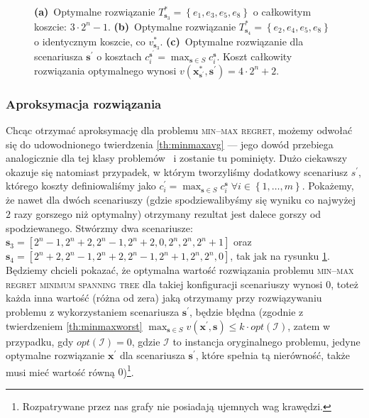 \begin{figure}[!htbp]
{		\textbf{(a)}~Optymalne rozwiązanie $T^{\ast}_{\textbf{s}_{3}} = \left\{ e_{1}, e_{3}, e_{5}, e_{8} \right\}$ o całkowitym koszcie: $3 \cdot 2^{n} - 1$.
		\textbf{(b)}~Optymalne rozwiązanie $T^{\ast}_{\textbf{s}_{4}} = \left\{ e_{2}, e_{4}, e_{5}, e_{8} \right\}$ o identycznym koszcie, co $v^{\ast}_{\textbf{s}_{3}}$.
		\textbf{(c)}~Optymalne rozwiązanie dla scenariusza $\textbf{s}^{\prime}$ o kosztach $c_{i}^{\textbf{s}^{\prime}} = \max_{\textbf{s} \in S} c_{i}^{\textbf{s}}$. Koszt całkowity rozwiązania optymalnego wynosi $v \left( \textbf{x}^{\ast}_{\textbf{s}^{\prime}}, \textbf{s}^{\prime} \right) = 4 \cdot 2^{n} + 2$.
	}
	\label{fig:minmaxregexample2}
\end{figure}

\subsubsection{Aproksymacja rozwiązania}

Chcąc otrzymać aproksymację dla problemu \textsc{min--max regret}, możemy odwołać się do udowodnionego twierdzenia \ref{th:minmaxavg} --- jego dowód przebiega analogicznie dla tej klasy problemów~\cite[$430$]{minmaxSurvey} i zostanie tu pominięty. Dużo ciekawszy okazuje się natomiast przypadek, w którym tworzyliśmy dodatkowy scenariusz $s^{\prime}$, którego koszty definiowaliśmy jako $c^{\prime}_{i} = \max_{\textbf{s} \in S} c^{\textbf{s}}_{i} \; \forall i \in \left\{ 1, \dots, m \right\}$. Pokażemy, że nawet dla dwóch scenariuszy (gdzie spodziewalibyśmy się wyniku co najwyżej $2$ razy gorszego niż optymalny) otrzymany rezultat jest dalece gorszy od spodziewanego. Stwórzmy dwa scenariusze: $\textbf{s}_{3} = \left[ 2^{n} - 1, 2^{n} + 2, 2^{n} - 1, 2^{n} + 2, 0, 2^{n}, 2^{n}, 2^{n} + 1 \right]$ oraz $\textbf{s}_{4} = \left[ 2^{n} + 2, 2^{n} - 1, 2^{n} + 2, 2^{n} - 1, 2^{n} + 1, 2^{n}, 2^{n}, 0 \right]$, tak jak na rysunku \ref{fig:minmaxregexample2}. Będziemy chcieli pokazać, że optymalna wartość rozwiązania problemu \textsc{min--max regret minimum spanning tree} dla takiej konfiguracji scenariuszy wynosi $0$, toteż każda inna wartość (różna od zera) jaką otrzymamy przy rozwiązywaniu problemu z wykorzystaniem scenariusza $\textbf{s}^{\prime}$, będzie błędna (zgodnie z twierdzeniem \ref{th:minmaxworst} $\max_{\textbf{s} \in S} v \left( \textbf{x}^{\prime}, \textbf{s} \right) \leqslant k \cdot opt \left( \mathcal{I} \right)$, zatem w przypadku, gdy $opt \left( \mathcal{I} \right) = 0$, gdzie $\mathcal{I}$ to instancja oryginalnego problemu, jedyne optymalne rozwiązanie $\textbf{x}^{\prime}$ dla scenariusza $\textbf{s}^{\prime}$, które spełnia tą nierówność, także musi mieć wartość równą $0$)\footnote{Rozpatrywane przez nas grafy nie posiadają ujemnych wag krawędzi.}. 

